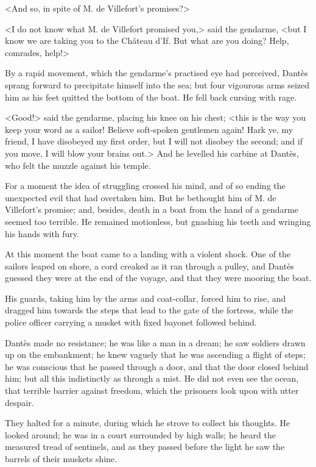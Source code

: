  <And so, in spite of M. de Villefort's promises?> 

 <I do not know what M. de Villefort promised you,> said the gendarme, <but I know we are taking you to the Château d'If. But what are you doing? Help, comrades, help!> 

 By a rapid movement, which the gendarme's practised eye had perceived, Dantès sprang forward to precipitate himself into the sea; but four vigourous arms seized him as his feet quitted the bottom of the boat. He fell back cursing with rage. 

 <Good!> said the gendarme, placing his knee on his chest; <this is the way you keep your word as a sailor! Believe soft-spoken gentlemen again! Hark ye, my friend, I have disobeyed my first order, but I will not disobey the second; and if you move, I will blow your brains out.> And he levelled his carbine at Dantès, who felt the muzzle against his temple. 

 For a moment the idea of struggling crossed his mind, and of so ending the unexpected evil that had overtaken him. But he bethought him of M. de Villefort's promise; and, besides, death in a boat from the hand of a gendarme seemed too terrible. He remained motionless, but gnashing his teeth and wringing his hands with fury. 

 At this moment the boat came to a landing with a violent shock. One of the sailors leaped on shore, a cord creaked as it ran through a pulley, and Dantès guessed they were at the end of the voyage, and that they were mooring the boat. 

 His guards, taking him by the arms and coat-collar, forced him to rise, and dragged him towards the steps that lead to the gate of the fortress, while the police officer carrying a musket with fixed bayonet followed behind. 

 Dantès made no resistance; he was like a man in a dream; he saw soldiers drawn up on the embankment; he knew vaguely that he was ascending a flight of steps; he was conscious that he passed through a door, and that the door closed behind him; but all this indistinctly as through a mist. He did not even see the ocean, that terrible barrier against freedom, which the prisoners look upon with utter despair. 

 They halted for a minute, during which he strove to collect his thoughts. He looked around; he was in a court surrounded by high walls; he heard the measured tread of sentinels, and as they passed before the light he saw the barrels of their muskets shine. 

